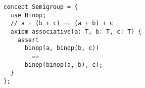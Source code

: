 \begin{lstlisting}[language=magnolia]
concept Semigroup = {
  use Binop;
  // a + (b + c) == (a + b) + c
  axiom associative(a: T, b: T, c: T) {
    assert
      binop(a, binop(b, c))
        ==
      binop(binop(a, b), c);
  }
};
\end{lstlisting}
